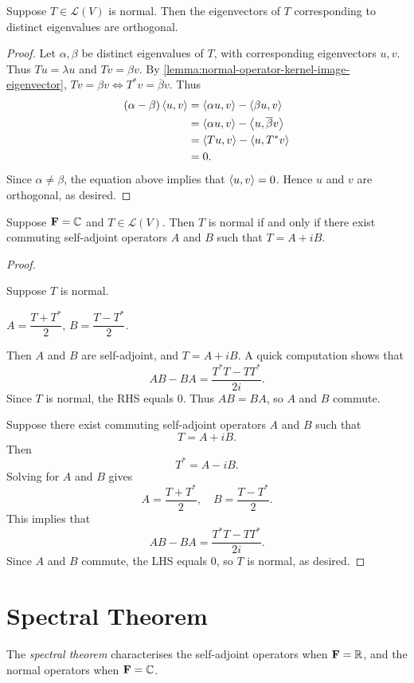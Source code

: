 \begin{proposition}
Suppose $T\in\mathcal{L}(V)$ is normal. Then the eigenvectors of $T$ corresponding to distinct eigenvalues are orthogonal.
\end{proposition}

\begin{proof}
Let $\alpha,\beta$ be distinct eigenvalues of $T$, with corresponding eigenvectors $u,v$. Thus $Tu=\lambda u$ and $Tv=\beta v$.
By \ref{lemma:normal-operator-kernel-image-eigenvector}, $Tv=\beta v\iff T^*v=\overline{\beta}v$.
Thus
\begin{align*}
(\alpha-\beta)\left\langle u,v\right\rangle
&=\left\langle\alpha u,v\right\rangle-\left\langle\beta u,v\right\rangle\\
&=\left\langle\alpha u,v\right\rangle-\left\langle u,\overline{\beta}v\right\rangle\\
&=\left\langle Tu,v\right\rangle-\left\langle u,T^*v\right\rangle\\
&=0.
\end{align*}
Since $\alpha\neq\beta$, the equation above implies that $\left\langle u,v\right\rangle=0$. 
Hence $u$ and $v$ are orthogonal, as desired.
\end{proof}

\begin{proposition}
Suppose $\mathbf F=\mathbb C$ and $T\in\mathcal{L}(V)$. Then $T$ is normal if and only if there exist commuting self-adjoint operators $A$ and $B$ such that $T=A+iB$.
\end{proposition}

\begin{proof} \

\forward Suppose $T$ is normal.
\begin{claim}
$A=\dfrac{T+T^*}{2}$, $B=\dfrac{T-T^*}{2}$.
\end{claim}
Then $A$ and $B$ are self-adjoint, and $T=A+iB$. A quick computation shows that
\[AB-BA=\frac{T^*T-TT^*}{2i}.\]
Since $T$ is normal, the RHS equals $0$. Thus $AB=BA$, so $A$ and $B$ commute.

\backward Suppose there exist commuting self-adjoint operators $A$ and $B$ such that
\[T=A+iB.\]
Then 
\[T^*=A-iB.\]
Solving for $A$ and $B$ gives
\[A=\frac{T+T^*}{2},\quad B=\frac{T-T^*}{2}.\]
This implies that
\[AB-BA=\frac{T^*T-TT^*}{2i}.\]
Since $A$ and $B$ commute, the LHS equals $0$, so $T$ is normal, as desired.
\end{proof}
\pagebreak

\section{Spectral Theorem}
The \emph{spectral theorem} characterises the self-adjoint operators when $\mathbf F=\mathbb R$, and the normal operators when $\mathbf F=\mathbb C$.

